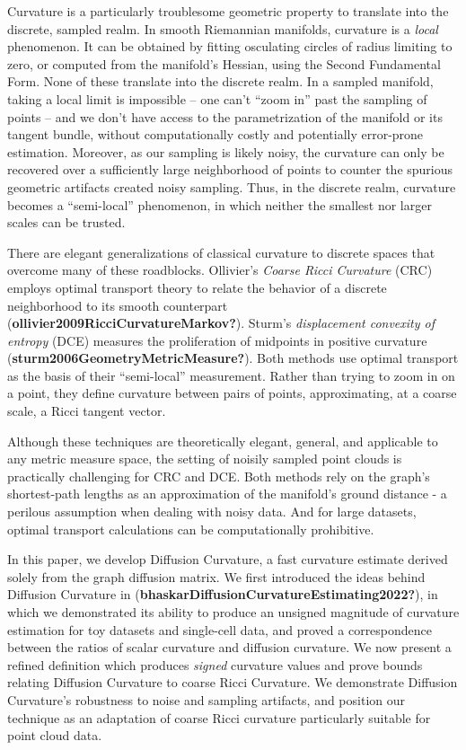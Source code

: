 \documentclass[
]{agujournal2019}
\begin{document}
Curvature is a particularly troublesome geometric property to translate
into the discrete, sampled realm. In smooth Riemannian manifolds,
curvature is a \emph{local} phenomenon. It can be obtained by fitting
osculating circles of radius limiting to zero, or computed from the
manifold's Hessian, using the Second Fundamental Form. None of these
translate into the discrete realm. In a sampled manifold, taking a local
limit is impossible -- one can't ``zoom in'' past the sampling of points
-- and we don't have access to the parametrization of the manifold or
its tangent bundle, without computationally costly and potentially
error-prone estimation. Moreover, as our sampling is likely noisy, the
curvature can only be recovered over a sufficiently large neighborhood
of points to counter the spurious geometric artifacts created noisy
sampling. Thus, in the discrete realm, curvature becomes a
``semi-local'' phenomenon, in which neither the smallest nor larger
scales can be trusted.

There are elegant generalizations of classical curvature to discrete
spaces that overcome many of these roadblocks. Ollivier's \emph{Coarse
Ricci Curvature} (CRC) employs optimal transport theory to relate the
behavior of a discrete neighborhood to its smooth counterpart
(\textbf{ollivier2009RicciCurvatureMarkov?}). Sturm's \emph{displacement
convexity of entropy} (DCE) measures the proliferation of midpoints in
positive curvature (\textbf{sturm2006GeometryMetricMeasure?}). Both
methods use optimal transport as the basis of their ``semi-local''
measurement. Rather than trying to zoom in on a point, they define
curvature between pairs of points, approximating, at a coarse scale, a
Ricci tangent vector.

Although these techniques are theoretically elegant, general, and
applicable to any metric measure space, the setting of noisily sampled
point clouds is practically challenging for CRC and DCE. Both methods
rely on the graph's shortest-path lengths as an approximation of the
manifold's ground distance - a perilous assumption when dealing with
noisy data. And for large datasets, optimal transport calculations can
be computationally prohibitive.

In this paper, we develop Diffusion Curvature, a fast curvature estimate
derived solely from the graph diffusion matrix. We first introduced the
ideas behind Diffusion Curvature in
(\textbf{bhaskarDiffusionCurvatureEstimating2022?}), in which we
demonstrated its ability to produce an unsigned magnitude of curvature
estimation for toy datasets and single-cell data, and proved a
correspondence between the ratios of scalar curvature and diffusion
curvature. We now present a refined definition which produces
\emph{signed} curvature values and prove bounds relating Diffusion
Curvature to coarse Ricci Curvature. We demonstrate Diffusion
Curvature's robustness to noise and sampling artifacts, and position our
technique as an adaptation of coarse Ricci curvature particularly
suitable for point cloud data.
\end{document}
